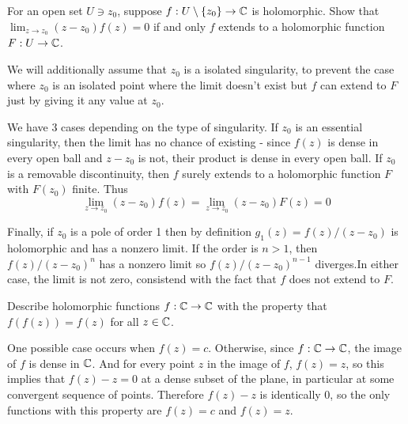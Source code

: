 \documentclass{homework}
\begin{document}
                                          \begin{problem}\label{riemann-removable-singularity}
                                            For an open set $U \ni z_0$, suppose
                                              $f : U \setminus \{z_0\} \to \mathbb{C}$ is holomorphic.  Show that
                                                $\lim_{z\to z_0} (z-z_0)f(z)=0$ if and only $f$ extends to a
                                                  holomorphic function $F : U \to \mathbb{C}$.
                                                  \end{problem}
                                                  \begin{solution}
                                                  We will additionally assume that $z_0$ is a isolated singularity, to prevent the case where $z_0$ is an isolated point where the limit doesn't exist but $f$ can extend to $F$ just by giving it any value at $z_0$.

                                                  We have 3 cases depending on the type of singularity. If $z_0$ is an essential singularity, then the limit has no chance of existing - since $f(z)$ is dense in every open ball and $z-z_0$ is not, their product is dense in every open ball.  If $z_0$ is a removable discontinuity, then $f$ surely extends to a holomorphic function $F$ with $F(z_0)$ finite. Thus
                                                  \[\lim_{z\to z_0} (z-z_0)f(z)=\lim_{z\to z_0} (z-z_0)F(z) = 0\]

                                                  Finally, if $z_0$ is a pole of order 1 then by definition $g_1(z) = f(z)/(z-z_0)$ is holomorphic and has a nonzero limit. If the order is $n>1$, then $f(z)/(z-z_0)^n$ has a nonzero limit so $f(z)/(z-z_0)^{n-1}$ diverges.In either case, the limit is not zero, consistend with the fact that $f$ does not extend to $F$.
                                                  \end{solution}

                                                  \begin{problem}\label{idempotent-entire}
                                                  Describe holomorphic functions
                                                    $f : \mathbb{C} \to \mathbb{C}$ with the property that $f(f(z)) = f(z)$ for all
                                                      $z \in \mathbb{C}$.
                                                      \end{problem}
                                                      \begin{solution}
                                                      One possible case occurs when $f(z)=c$. Otherwise, since $f:\mathbb{C}\to\mathbb{C}$, the image of $f$ is dense in $\mathbb{C}$. And for every point $z$ in the image of $f$, $f(z) = z$, so this implies that $f(z)-z = 0$ at a dense subset of the plane, in particular at some convergent sequence of points. Therefore $f(z)-z$ is identically 0, so the only functions with this property are $f(z)=c$ and $f(z)=z$.
                                                      \end{solution}
\end{document}
